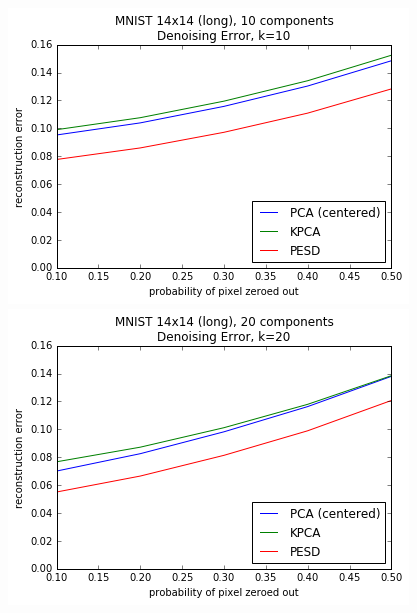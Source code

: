 \documentclass[]{article}
\begin{document}
\begin{figure}[!h]
\begin{center}
\includegraphics[scale=0.5]{figures/mnist_14_long_speckle_k10}
\includegraphics[scale=0.5]{figures/mnist_14_long_speckle_k20}


\end{center}
\end{figure}
\end{document}
